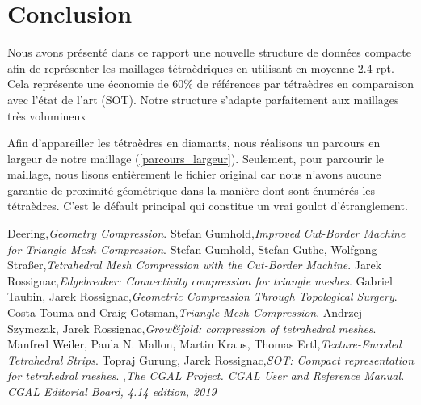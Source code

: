 \documentclass[a4paper,11pt,openany]{article}
\begin{document}
\section{Conclusion}
Nous avons présenté dans ce rapport une nouvelle structure de données compacte afin de représenter les maillages tétraèdriques en utilisant en moyenne 2.4 rpt. Cela représente une économie de 60\% de références par tétraèdres en comparaison avec l'état de l'art (SOT). Notre structure s'adapte parfaitement aux maillages très volumineux 


Afin d'appareiller les tétraèdres en diamants, nous réalisons un parcours en largeur de notre maillage (\ref{parcours_largeur}). Seulement, pour parcourir le maillage, nous lisons entièrement le fichier original car nous n'avons aucune garantie de proximité géométrique dans la manière dont sont énumérés les tétraèdres. C'est le défault principal qui constitue un vrai goulot d'étranglement.

\begin{thebibliography}{999}
Deering,\emph{Geometry Compression}. 
Stefan Gumhold,\emph{Improved Cut-Border Machine for Triangle Mesh Compression}. 
Stefan Gumhold, Stefan Guthe, Wolfgang Straßer,\emph{Tetrahedral Mesh Compression with the Cut-Border Machine}. 
Jarek Rossignac,\emph{Edgebreaker: Connectivity compression for triangle meshes}. 
Gabriel Taubin, Jarek Rossignac,\emph{Geometric Compression Through Topological Surgery}. 
Costa Touma and Craig Gotsman,\emph{Triangle Mesh Compression}. 
Andrzej Szymczak, Jarek Rossignac,\emph{Grow\&fold: compression of tetrahedral meshes}. 
Manfred Weiler, Paula N. Mallon, Martin Kraus, Thomas Ertl,\emph{Texture-Encoded Tetrahedral Strips}. 
Topraj Gurung, Jarek Rossignac,\emph{SOT: Compact representation for tetrahedral meshes}. 
,\emph{The CGAL Project. CGAL User and Reference Manual. CGAL Editorial Board, 4.14 edition, 2019}




\end{thebibliography}
\end{document}
